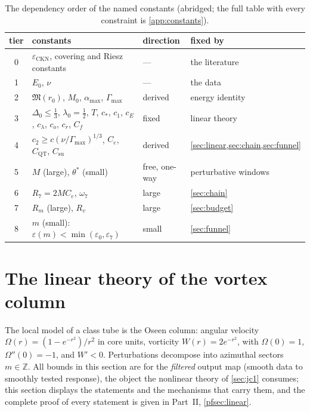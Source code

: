 \documentclass[11pt,letterpaper]{amsart}
\theoremstyle{definition}
\theoremstyle{remark}
\newcommand{\om}{\omega}
\begin{document}
\begin{table}[ht]
\centering\small
\begin{tabular}{@{}clll@{}}
\toprule
tier & constants & direction & fixed by \\
\midrule
0 & $\varepsilon_{\mathrm{CKN}}$, covering and Riesz constants & --- & the literature \\
1 & $E_0$, $\nu$ & --- & the data \\
2 & $\mathfrak{M}(r_0)$, $M_0$, $\alpha_{\max}$, $\Gamma_{\max}$ & derived & energy identity \\
3 & $\Delta_0\le\tfrac13$, $\lambda_0=\tfrac12$, $T$, $c_*$, $c_1$, $c_E$, $c_\lambda$, $c_o$, $c_r$, $C_f$ & fixed & linear theory \\
4 & $c_2\ge c(\nu/\Gamma_{\max})^{1/3}$, $C_e$, $C_{\mathrm{QT}}$, $C_{\mathrm{su}}$ & derived & \cref{sec:linear,sec:chain,sec:funnel} \\
5 & $M$ (large), $\theta^*$ (small) & free, one-way & perturbative windows \\
6 & $R_7=2MC_e$, $\om_7$ & large & \cref{sec:chain} \\
7 & $R_m$ (large), $R_v$ & large & \cref{sec:budget} \\
8 & $m$ (small): $\varepsilon(m)<\min(\varepsilon_0,\varepsilon_7)$ & small & \cref{sec:funnel} \\
\bottomrule
\end{tabular}
\caption{The dependency order of the named constants (abridged; the full table with
every constraint is \cref{app:constants}).}\label{tab:constants}
\end{table}

\section{The linear theory of the vortex column}\label{sec:linear}

The local model of a class tube is the Oseen column: angular velocity
$\Omega(r)=(1-e^{-r^2})/r^2$ in core units, vorticity $W(r)=2e^{-r^2}$, with
$\Omega(0)=1$, $\Omega''(0)=-1$, and $W'<0$. Perturbations decompose into azimuthal
sectors $m\in\mathbb{Z}$. All bounds in this section are for the \emph{filtered} output
map (smooth data to smoothly tested response), the object the nonlinear theory of
\cref{sec:jc1} consumes; this section displays the statements and the mechanisms that
carry them, and the complete proof of every statement is given in Part~II,
\cref{pfsec:linear}.
\end{document}
